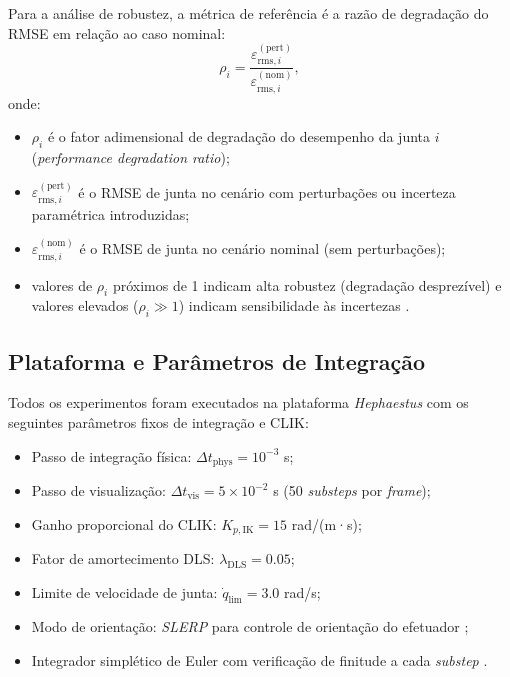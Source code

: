 Para a análise de robustez, a métrica de referência é a razão de degradação do RMSE em relação ao caso nominal:
\begin{equation}
    \rho_i = \frac{\varepsilon_{\text{rms},i}^{(\text{pert})}}{\varepsilon_{\text{rms},i}^{(\text{nom})}},
    \label{eq:degradacao}
\end{equation}
onde:
\begin{itemize}
    \item $\rho_i$ é o fator adimensional de degradação do desempenho da junta $i$ (\textit{performance degradation ratio});
    \item $\varepsilon_{\text{rms},i}^{(\text{pert})}$ é o RMSE de junta no cenário com perturbações ou incerteza paramétrica introduzidas;
    \item $\varepsilon_{\text{rms},i}^{(\text{nom})}$ é o RMSE de junta no cenário nominal (sem perturbações);
    \item valores de $\rho_i$ próximos de 1 indicam alta robustez (degradação desprezível) e valores elevados ($\rho_i \gg 1$) indicam sensibilidade às incertezas \cite{slotine1991applied, moreno2012strict}.
\end{itemize}

\subsection{Plataforma e Parâmetros de Integração}

Todos os experimentos foram executados na plataforma \textit{Hephaestus} com os seguintes parâmetros fixos de integração e CLIK:

\begin{itemize}
    \item Passo de integração física: $\Delta t_{\text{phys}} = 10^{-3}$ s;
    \item Passo de visualização: $\Delta t_{\text{vis}} = 5 \times 10^{-2}$ s (50 \textit{substeps} por \textit{frame});
    \item Ganho proporcional do CLIK: $K_{p,\text{IK}} = 15$ rad/(m·s);
    \item Fator de amortecimento DLS: $\lambda_{\text{DLS}} = 0.05$;
    \item Limite de velocidade de junta: $\dot{q}_{\text{lim}} = 3.0$ rad/s;
    \item Modo de orientação: \textit{SLERP} para controle de orientação do efetuador \cite{shoemake1985animating, dam1998quaternions};
    \item Integrador simplético de Euler com verificação de finitude a cada \textit{substep} \cite{leimkuhler2004simulating, hairer2006geometric}.
\end{itemize}

